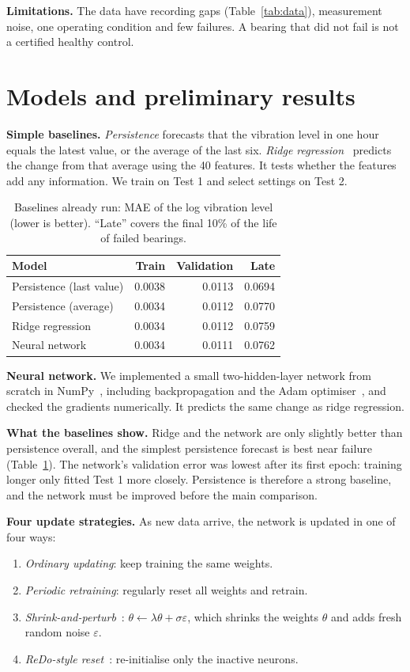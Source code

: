 \documentclass[11pt,twocolumn]{article}
\begin{document}
\textbf{Limitations.} The data have recording gaps (Table~\ref{tab:data}), measurement noise, one operating condition and few failures. A bearing that did not fail is not a certified healthy control.

\section{Models and preliminary results}
\textbf{Simple baselines.} \emph{Persistence} forecasts that the vibration level in one hour equals the latest value, or the average of the last six. \emph{Ridge regression}~\citep{ridge} predicts the change from that average using the 40 features. It tests whether the features add any information. We train on Test 1 and select settings on Test 2.

\begin{table}[t]
\centering\small\setlength{\tabcolsep}{3pt}
\caption{Baselines already run: MAE of the log vibration level (lower is better). ``Late'' covers the final 10\% of the life of failed bearings.}
\begin{tabular}{@{}lrrr@{}}\toprule
Model & Train & Validation & Late \\\midrule
Persistence (last value) & 0.0038 & 0.0113 & 0.0694 \\
Persistence (average) & 0.0034 & 0.0112 & 0.0770 \\
Ridge regression & 0.0034 & 0.0112 & 0.0759 \\
Neural network & 0.0034 & 0.0111 & 0.0762 \\\bottomrule
\end{tabular}\label{tab:base}
\end{table}

\textbf{Neural network.} We implemented a small two-hidden-layer network from scratch in NumPy~\citep{numpy}, including backpropagation and the Adam optimiser~\citep{adam}, and checked the gradients numerically. It predicts the same change as ridge regression.

\textbf{What the baselines show.} Ridge and the network are only slightly better than persistence overall, and the simplest persistence forecast is best near failure (Table~\ref{tab:base}). The network's validation error was lowest after its first epoch: training longer only fitted Test 1 more closely. Persistence is therefore a strong baseline, and the network must be improved before the main comparison.

\textbf{Four update strategies.} As new data arrive, the network is updated in one of four ways:
\begin{enumerate}
\item \emph{Ordinary updating}: keep training the same weights.
\item \emph{Periodic retraining}: regularly reset all weights and retrain.
\item \emph{Shrink-and-perturb}~\citep{ash2020}: $\theta\leftarrow\lambda\theta+\sigma\varepsilon$, which shrinks the weights $\theta$ and adds fresh random noise $\varepsilon$.
\item \emph{ReDo-style reset}~\citep{sokar2023}: re-initialise only the inactive neurons.
\end{enumerate}
\end{document}
